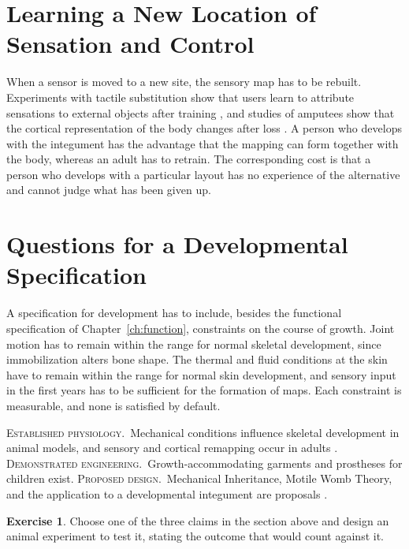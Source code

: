 \documentclass[11pt,openany]{book}
\theoremstyle{definition}
\newtheorem{exercise}{Exercise}[chapter]
\theoremstyle{remark}
\newcommand{\est}{\textsc{Established physiology.}\ }
\newcommand{\dem}{\textsc{Demonstrated engineering.}\ }
\newcommand{\pro}{\textsc{Proposed design.}\ }
\begin{document}
\section{Learning a New Location of Sensation and Control}

When a sensor is moved to a new site, the sensory map has to be rebuilt. Experiments with tactile substitution show that users learn to attribute sensations to external objects after training \cite{bachyrita1969}, and studies of amputees show that the cortical representation of the body changes after loss \cite{flor1995}. A person who develops with the integument has the advantage that the mapping can form together with the body, whereas an adult has to retrain. The corresponding cost is that a person who develops with a particular layout has no experience of the alternative and cannot judge what has been given up.

\section{Questions for a Developmental Specification}

A specification for development has to include, besides the functional specification of Chapter~\ref{ch:function}, constraints on the course of growth. Joint motion has to remain within the range for normal skeletal development, since immobilization alters bone shape. The thermal and fluid conditions at the skin have to remain within the range for normal skin development, and sensory input in the first years has to be sufficient for the formation of maps. Each constraint is measurable, and none is satisfied by default.

\begin{evidence}
\est Mechanical conditions influence skeletal development in animal models, and sensory and cortical remapping occur in adults \cite{pitsillides2006,nowlan2010,bachyrita1969,flor1995}. \dem Growth-accommodating garments and prostheses for children exist. \pro Mechanical Inheritance, Motile Womb Theory, and the application to a developmental integument are proposals \cite{flyxion2026mi,flyxion2026mwt}.
\end{evidence}

\begin{exercise}
Choose one of the three claims in the section above and design an animal experiment to test it, stating the outcome that would count against it.
\end{exercise}
\end{document}
